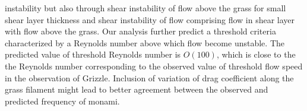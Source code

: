 \documentclass[aps,prl,twocolumn,showpacs,superscriptaddress,groupedaddress,10pt]{revtex4-1}  %
\begin{document}
instability but also through shear instability of flow above the grass for small shear layer thickness and shear instability of flow comprising flow in shear layer with flow above the grass.
Our analysis further predict a threshold criteria characterized by a Reynolds number above which flow become unstable. The predicted value of threshold Reynolds number is $O(100)$, which is 
close to the the Reynolds number corresponding to the observed value of threshold flow speed in the observation of Grizzle. Inclusion of variation of drag coefficient along the grass filament
might lead to better agreement between the observed and predicted frequency of monami. 
{}

\end{document}

